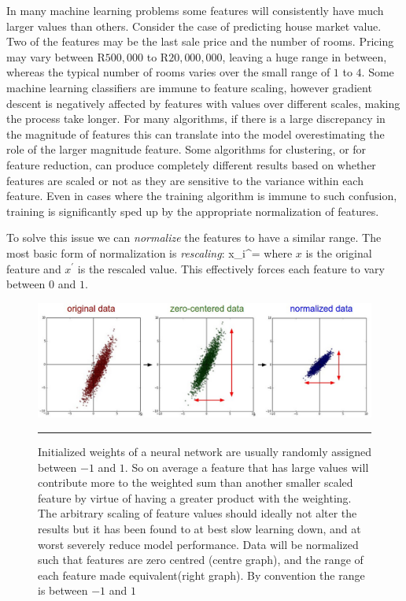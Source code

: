 In many machine learning problems some features will consistently have much larger values than others.
Consider the case of predicting house market value.
Two of the features may be the last sale price and the number of rooms.
Pricing may vary between R$500,000$ to R$20,000,000$, leaving a huge range in between, whereas the typical number of rooms varies over the small range of $1$ to $4$.
Some machine learning classifiers are immune to feature scaling, however gradient descent is negatively affected by features with values over different scales, making the process take longer\citep{featureScaling}.
For many algorithms, if there is a large discrepancy in the magnitude of features this can translate into the model overestimating the role of the larger magnitude feature.
Some algorithms for clustering, or for feature reduction, can produce completely different results based on whether features are scaled or not as they are sensitive to the variance within each feature.
Even in cases where the training algorithm is immune to such confusion, training is significantly sped up by the appropriate normalization of features.

To solve this issue we can \textit{normalize} the features to have a similar range.
The most basic form of normalization is \textit{rescaling}:
\be
x_i^\prime = 
\ee
where $x$ is the original feature and $x^\prime$ is the rescaled value.
This effectively forces each feature to vary between $0$ and $1$.
\begin{figure}[htbp]
	\centering
		\includegraphics[width = 1.0\textwidth]{./Figures/normalization_1_prepro1.jpeg}
		\rule{35em}{0.5pt}
	\caption[Normalization]{Initialized weights of a neural network are usually randomly assigned between $-1$ and $1$. So on average a feature that has large values will contribute more to the weighted sum than another smaller scaled feature by virtue of having a greater product with the weighting. The arbitrary scaling of feature values should ideally not alter the results but it has been found to at best slow learning down, and at worst severely reduce model performance. Data will be normalized such that features are zero centred (centre graph), and the range of each feature made equivalent(right graph). By convention the range is between $-1$ and $1$}
	\label{fig:Normalization_2}
\end{figure}

